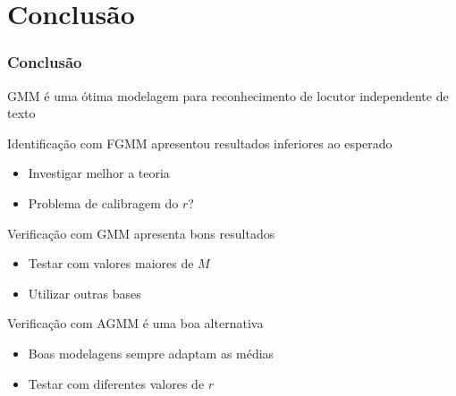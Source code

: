 \section{Conclusão}
\label{sec:conclusion}

\contentscurrent

\begin{frame}
\frametitle{Conclusão}
\begin{description}
    \item GMM é uma ótima modelagem para reconhecimento de locutor independente de texto
    \pause
    \item Identificação com FGMM apresentou resultados inferiores ao esperado
    \pause
    \begin{itemize}
        \item Investigar melhor a teoria
        \pause
        \item Problema de calibragem do $r$?
        \pause
    \end{itemize}
    \item Verificação com GMM apresenta bons resultados
    \pause
    \begin{itemize}
        \item Testar com valores maiores de $M$
        \pause
        \item Utilizar outras bases
        \pause
    \end{itemize}
    \item Verificação com AGMM é uma boa alternativa
    \pause
    \begin{itemize}
        \item Boas modelagens sempre adaptam as médias
        \pause
        \item Testar com diferentes valores de $r$
    \end{itemize}
\end{description}
\end{frame}